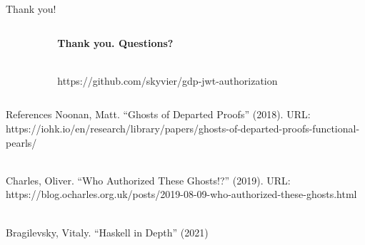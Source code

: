 \documentclass[
  9pt,
  ignorenonframetext,
]{beamer}
\begin{document}
\begin{frame}{Thank you!}
\protect\hypertarget{thank-you}{}
\begin{columns}[T]
\begin{column}{0.3\textwidth}
\end{column}

\begin{column}{0.4\textwidth}
\textbf{Thank you. Questions?}\\
\strut \\

https://github.com/skyvier/gdp-jwt-authorization
\end{column}

\begin{column}{0.3\textwidth}
\end{column}
\end{columns}






\end{frame}

\begin{frame}{References}
\protect\hypertarget{references}{}
Noonan, Matt. ``Ghosts of Departed Proofs'' (2018). URL:
https://iohk.io/en/research/library/papers/ghosts-of-departed-proofs-functional-pearls/\\
\strut \\

Charles, Oliver. ``Who Authorized These Ghosts!?'' (2019). URL:
https://blog.ocharles.org.uk/posts/2019-08-09-who-authorized-these-ghosts.html\\
\strut \\

Bragilevsky, Vitaly. ``Haskell in Depth'' (2021)

\end{frame}
\end{document}
